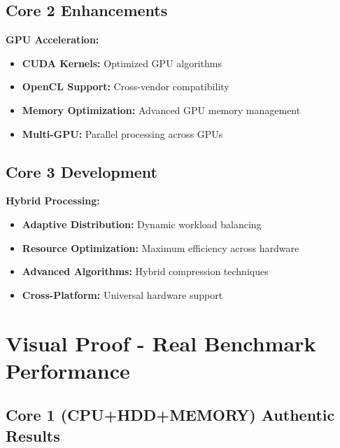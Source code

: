 \documentclass[12pt,a4paper]{article}
\begin{document}
\subsection{Core 2 Enhancements}

\textbf{GPU Acceleration:}
\begin{itemize}
    \item \textbf{CUDA Kernels:} Optimized GPU algorithms
    \item \textbf{OpenCL Support:} Cross-vendor compatibility
    \item \textbf{Memory Optimization:} Advanced GPU memory management
    \item \textbf{Multi-GPU:} Parallel processing across GPUs
\end{itemize}

\subsection{Core 3 Development}

\textbf{Hybrid Processing:}
\begin{itemize}
    \item \textbf{Adaptive Distribution:} Dynamic workload balancing
    \item \textbf{Resource Optimization:} Maximum efficiency across hardware
    \item \textbf{Advanced Algorithms:} Hybrid compression techniques
    \item \textbf{Cross-Platform:} Universal hardware support
\end{itemize}

\section{Visual Proof - Real Benchmark Performance}

\subsection{Core 1 (CPU+HDD+MEMORY) Authentic Results}
\end{document}
